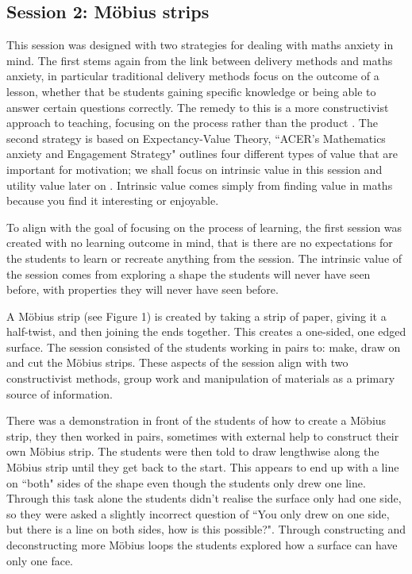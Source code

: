 \documentclass[11pt, a4paper, notitlepage]{article}
\begin{document}
\subsection{Session 2: M\"obius strips}
This session was designed with two strategies for dealing with maths anxiety in mind. The first stems again from the link between delivery methods and maths anxiety, in particular traditional delivery methods focus on the outcome of a lesson, whether that be students gaining specific knowledge or being able to answer certain questions correctly. The remedy to this is a more constructivist approach to teaching, focusing on the process rather than the product \cite{Finlayson:2014}. The second strategy is based on Expectancy-Value Theory, ``ACER's Mathematics anxiety and Engagement Strategy" outlines four different types of value that are important for motivation; we shall focus on intrinsic value in this session and utility value later on \cite{MAES:2024} . Intrinsic value comes simply from finding value in maths because you find it interesting or enjoyable.
\par
To align with the goal of focusing on the process of learning, the first session was created with no learning outcome in mind, that is there are no expectations for the students to learn or recreate anything from the session. The intrinsic value of the session comes from exploring a shape the students will never have seen before, with properties they will never have seen before. 
\par
A M\"obius strip (see Figure 1) is created by taking a strip of paper, giving it a half-twist, and then joining the ends together. This creates a one-sided, one edged surface. The session consisted of the students working in pairs to: make, draw on and cut the M\"obius strips. These aspects of the session align with two constructivist methods, group work and manipulation of materials as a primary source of information. 
\par
There was a demonstration in front of the students of how to create a M\"obius strip, they then worked in pairs, sometimes with external help to construct their own M\"obius strip. The students were then told to draw lengthwise along the M\"obius strip until they get back to the start. This appears to end up with a line on ``both" sides of the shape even though the students only drew one line. Through this task alone the students didn't realise the surface only had one side, so they were asked a slightly incorrect question of ``You only drew on one side, but there is a line on both sides, how is this possible?". Through constructing and deconstructing more M\"obius loops the students explored how a surface can have only one face.
\end{document}
